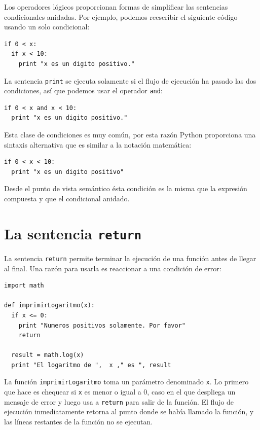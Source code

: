 Los operadores lógicos proporcionan formas de simplificar las sentencias
condicionales anidadas. Por ejemplo, podemos reescribir el siguiente
código usando un solo condicional:

\beforeverb
\begin{verbatim}
if 0 < x:
  if x < 10:
    print "x es un digito positivo."
\end{verbatim}
\afterverb
%
La sentencia \texttt{print} se ejecuta solamente si
el flujo de ejecución ha pasado las dos condiciones, así que
podemos usar el operador \texttt{and}:

\beforeverb
\begin{verbatim}
if 0 < x and x < 10:
  print "x es un digito positivo."
\end{verbatim}
\afterverb
%
Esta clase de condiciones es muy común, por esta razón Python proporciona
una sintaxis alternativa que es similar a la notación matemática:

\beforeverb
\begin{verbatim}
if 0 < x < 10:
  print "x es un digito positivo"
\end{verbatim}
\afterverb
%
Desde el punto de vista semántico ésta condición es la misma
que la expresión compuesta y que el condicional anidado.


\section{La  sentencia \texttt{return} }

La sentencia \texttt{return} permite terminar la ejecución de una función
antes de llegar al final. Una razón para usarla es reaccionar a una
condición de error:

\beforeverb
\begin{verbatim}
import math

def imprimirLogaritmo(x):
  if x <= 0:
    print "Numeros positivos solamente. Por favor"
    return

  result = math.log(x)
  print "El logaritmo de ",  x ," es ", result
\end{verbatim}
\afterverb
%
La función \texttt{imprimirLogaritmo} toma un parámetro
denominado \texttt{x}.  Lo primero que hace es chequear si 
\texttt{x} es menor o igual a 0, caso en el que despliega un 
mensaje de error y luego usa a \texttt{return} para salir de la función.
El flujo de ejecución inmediatamente retorna al punto donde se había llamado
la función, y las líneas restantes de la función no se ejecutan.

